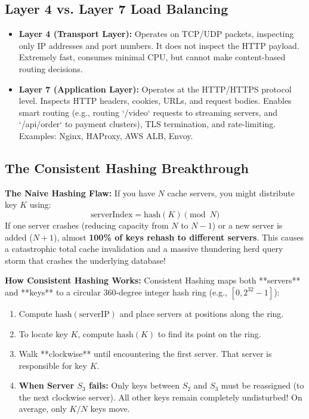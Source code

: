 \documentclass[10pt,journal,compsoc,onecolumn]{IEEEtran}
\begin{document}
\subsection{Layer 4 vs. Layer 7 Load Balancing}
\begin{itemize}
    \item \textbf{Layer 4 (Transport Layer):} Operates on TCP/UDP packets, inspecting only IP addresses and port numbers. It does not inspect the HTTP payload. Extremely fast, consumes minimal CPU, but cannot make content-based routing decisions.
    \item \textbf{Layer 7 (Application Layer):} Operates at the HTTP/HTTPS protocol level. Inspects HTTP headers, cookies, URLs, and request bodies. Enables smart routing (e.g., routing `/video` requests to streaming servers, and `/api/order` to payment clusters), TLS termination, and rate-limiting. Examples: Nginx, HAProxy, AWS ALB, Envoy.
\end{itemize}

\subsection{The Consistent Hashing Breakthrough}

\textbf{The Naive Hashing Flaw:}
If you have $N$ cache servers, you might distribute key $K$ using:
\begin{equation}
\text{serverIndex} = \text{hash}(K) \pmod N
\end{equation}
If one server crashes (reducing capacity from $N$ to $N-1$) or a new server is added ($N+1$), almost \textbf{100\% of keys rehash to different servers}. This causes a catastrophic total cache invalidation and a massive thundering herd query storm that crashes the underlying database!

\textbf{How Consistent Hashing Works:}
Consistent Hashing maps both **servers** and **keys** to a circular 360-degree integer hash ring (e.g., $[0, 2^{32} - 1]$):
\begin{enumerate}
    \item Compute $\text{hash}(\text{serverIP})$ and place servers at positions along the ring.
    \item To locate key $K$, compute $\text{hash}(K)$ to find its point on the ring.
    \item Walk **clockwise** until encountering the first server. That server is responsible for key $K$.
    \item \textbf{When Server $S_3$ fails:} Only keys between $S_2$ and $S_3$ must be reassigned (to the next clockwise server). All other keys remain completely undisturbed! On average, only $K/N$ keys move.
\end{enumerate}
\end{document}
